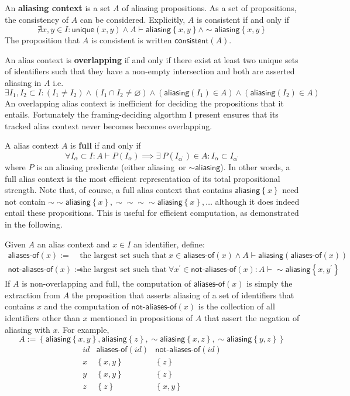 \documentclass{article}
\newcommand{\tsf}{\textsf}
\newcommand{\tit}{\textit}
\newcommand{\tbf}{\textbf}
\newcommand{\set}[1]{\left\{ #1 \right\}}
\newcommand{\p}{^\prime}
\renewcommand{\empty}{\varnothing}
\newcommand{\entails}{\vdash}
\newcommand{\pnot}{\sim}
\newcommand{\aliasing}{\tsf{aliasing}}
\newcommand{\unique}{\tsf{unique}}
\newcommand{\consistent}{\tsf{consistent}}
\begin{document}
An \tbf{aliasing context} is a set $A$ of aliasing propositions.
As a set of propositions, the consistency of $A$ can be considered.
Explicitly, $A$ is consistent if and only if
$$
\nexists x,y \in I : \unique(x,y) \land A \entails \aliasing \set{x,y} \land \pnot \aliasing \set{x,y}
$$
The proposition that $A$ is consistent is written $\consistent(A)$.

An alias context is \tbf{overlapping} if and only if there exist at least two unique sets of identifiers such that they have a non-empty intersection and both are asserted aliasing in $A$ i.e.
$$
\exists I_1, I_2 \subset I
:     (I_1 \neq I_2)
\land (I_1 \cap I_2 \neq \empty)
\land (\aliasing (I_1) \in A)
\land (\aliasing (I_2) \in A)
$$
An overlapping alias context is inefficient for deciding the propositions that it entails.
Fortunately the framing-deciding algorthm I present ensures that its tracked alias context never becomes becomes overlapping.

A alias context $A$ is \tbf{full} if and only if
$$
\forall I_\alpha \subset I
:
A \entails P(I_\alpha) \implies \exists \ P(I_{\alpha\p}) \in A : I_\alpha \subset I_{\alpha\p}
$$
where $P$ is an aliasing predicate (either \aliasing \ or $\pnot\aliasing$).
In other words, a full alias context is the most efficient representation of its total propositional strength.
Note that, of course, a full alias context that contains $\aliasing\set{x}$ need not contain $\pnot \pnot \aliasing\set{x}, \pnot \pnot \pnot \pnot \aliasing\set{x}, \dots$ although it does indeed entail these propositions.
This is useful for efficient computation, as demonstrated in the following.

Given $A$ an alias context and $x \in I$ an identifier, define:
\begin{align*}
  \tsf{aliases-of}(x)
  := & \
  \text{the largest set such that} \
  x \in \tsf{aliases-of}(x) \land A \entails \aliasing (\tsf{aliases-of}(x))
  \\
  \tsf{not-aliases-of}(x)
  := & \
  \text{the largest set such that} \
  \forall x\p \in \tsf{not-aliases-of}(x) : A \entails \pnot \aliasing\set{x,y\p}
\end{align*}
If $A$ is non-overlapping and full,
the computation of $\tsf{aliases-of}(x)$ is simply the extraction from $A$ the proposition that asserts aliasing of a set of identifiers that contains $x$
and the computation of $\tsf{not-aliases-of}(x)$ is the collection of all identifiers other than $x$ mentioned in propositions of $A$ that assert the negation of aliasing with $x$. For example,
$$
A := \set{ \aliasing\set{x,y}, \aliasing\set{z}, \pnot\aliasing\set{x,z}, \pnot\aliasing\set{y,z} }
$$
$$
\begin{array}{c|c|c}
\tit{id} & \tsf{aliases-of}(\tit{id}) & \tsf{not-aliases-of}(\tit{id})
\\ \hline
x & \set{x,y} & \set{z} \\
y & \set{x,y} & \set{z} \\
z & \set{z}   & \set{x,y}
\end{array}
$$
\end{document}
